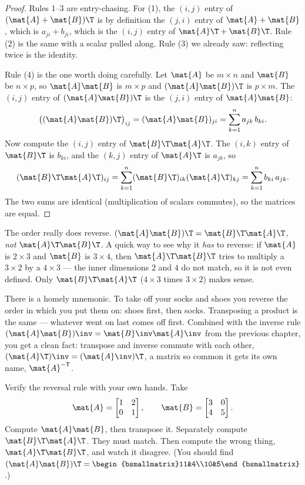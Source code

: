 \begin{proof}
Rules 1--3 are entry-chasing. For (1), the $(i,j)$ entry of $(\mat{A}+\mat{B})\T$ is by definition the
$(j,i)$ entry of $\mat{A}+\mat{B}$, which is $a_{ji}+b_{ji}$, which is the $(i,j)$ entry of
$\mat{A}\T+\mat{B}\T$. Rule (2) is the same with a scalar pulled along. Rule (3) we already saw:
reflecting twice is the identity.

Rule (4) is the one worth doing carefully. Let $\mat{A}$ be $m\times n$ and $\mat{B}$ be $n\times p$,
so $\mat{A}\mat{B}$ is $m\times p$ and $(\mat{A}\mat{B})\T$ is $p\times m$. The $(i,j)$ entry of
$(\mat{A}\mat{B})\T$ is the $(j,i)$ entry of $\mat{A}\mat{B}$:
\[
  \big((\mat{A}\mat{B})\T\big)_{ij}
  = (\mat{A}\mat{B})_{ji}
  = \sum_{k=1}^{n} a_{jk}\, b_{ki}.
\]
Now compute the $(i,j)$ entry of $\mat{B}\T\mat{A}\T$. The $(i,k)$ entry of $\mat{B}\T$ is $b_{ki}$,
and the $(k,j)$ entry of $\mat{A}\T$ is $a_{jk}$, so
\[
  (\mat{B}\T\mat{A}\T)_{ij}
  = \sum_{k=1}^{n} (\mat{B}\T)_{ik}(\mat{A}\T)_{kj}
  = \sum_{k=1}^{n} b_{ki}\, a_{jk}.
\]
The two sums are identical (multiplication of scalars commutes), so the matrices are equal.
\end{proof}

\begin{trapbox}
The order really does reverse. $(\mat{A}\mat{B})\T = \mat{B}\T\mat{A}\T$, \emph{not}
$\mat{A}\T\mat{B}\T$. A quick way to see why it \emph{has} to reverse: if $\mat{A}$ is $2\times 3$ and
$\mat{B}$ is $3\times 4$, then $\mat{A}\T\mat{B}\T$ tries to multiply a $3\times 2$ by a $4\times 3$ ---
the inner dimensions $2$ and $4$ do not match, so it is not even defined. Only $\mat{B}\T\mat{A}\T$
($4\times 3$ times $3\times 2$) makes sense.
\end{trapbox}

There is a homely mnemonic. To take off your socks and shoes you reverse the order in which you put
them on: shoes first, then socks. Transposing a product is the same --- whatever went on last comes
off first. Combined with the inverse rule $(\mat{A}\mat{B})\inv = \mat{B}\inv\mat{A}\inv$ from the
previous chapter, you get a clean fact: transpose and inverse commute with each other,
$(\mat{A}\T)\inv = (\mat{A}\inv)\T$, a matrix so common it gets its own name, $\mat{A}^{-\mathsf{T}}$.

\begin{labbox}
Verify the reversal rule with your own hands. Take
\[
  \mat{A}=\begin{bmatrix}1&2\\0&1\end{bmatrix},\qquad
  \mat{B}=\begin{bmatrix}3&0\\4&5\end{bmatrix}.
\]
Compute $\mat{A}\mat{B}$, then transpose it. Separately compute $\mat{B}\T\mat{A}\T$. They must
match. Then compute the wrong thing, $\mat{A}\T\mat{B}\T$, and watch it disagree. (You should find
$(\mat{A}\mat{B})\T = \begin{bsmallmatrix}11&4\\10&5\end{bsmallmatrix}$.)
\end{labbox}

